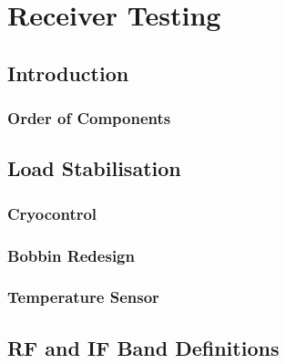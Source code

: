 \chapter{Receiver Testing}

\section{Introduction}
  \subsection{Order of Components}


\section{Load Stabilisation}
  \subsection{Cryocontrol}
\subsection{Bobbin Redesign}
\subsection{Temperature Sensor}


\section{RF and IF Band Definitions}




